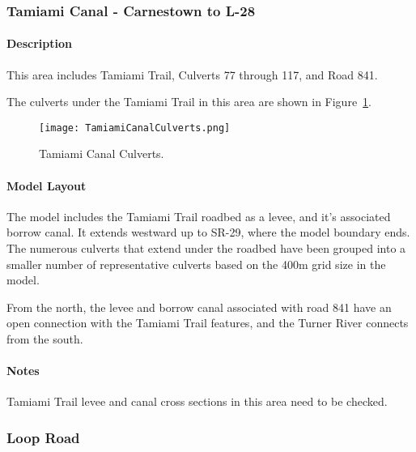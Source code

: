 \subsubsection{Tamiami Canal - Carnestown to L-28}

\paragraph{Description}
This area includes Tamiami Trail, Culverts 77 through 117, and Road 841.

The culverts under the Tamiami Trail in this area are shown in Figure~\ref{fig:TamiamiCanalCulverts}.

\begin{figure}[!h]
  \begin{center}
  \texttt{[image: TamiamiCanalCulverts.png]}
  \caption{Tamiami Canal Culverts.}
  \label{fig:TamiamiCanalCulverts}
  \end{center}
\end{figure}

\paragraph{Model Layout}
The model includes the Tamiami Trail roadbed as a levee, and it's associated borrow canal. It extends westward up to SR-29, where the model boundary ends.
The numerous culverts that extend under the roadbed have been grouped into a smaller number of representative culverts based on the 400m grid size in the model.

From the north, the levee and borrow canal associated with road 841 have an open connection with the Tamiami Trail features, and the Turner River connects from the south.




\begin{notes}
\paragraph{Notes}
Tamiami Trail levee and canal cross sections in this area need to be checked.
\end{notes}


\clearpage

\subsubsection{Loop Road}
